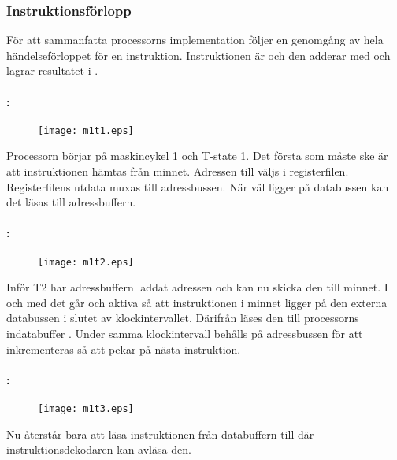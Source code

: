 \documentclass[main.tex]{subfiles}
\newcommand{\diagw}{0.8\textwidth}
\begin{document}
\subsubsection{Instruktionsförlopp}
För att sammanfatta processorns implementation följer en genomgång av hela
händelseförloppet för en instruktion. Instruktionen är  och den
adderar  med  och lagrar resultatet i .

\paragraph{: }
\begin{figure}[H]
    \center
    \texttt{[image: m1t1.eps]}
\end{figure}
Processorn börjar på maskincykel 1 och T-state 1. Det första som måste ske är
att instruktionen hämtas från minnet. Adressen till  väljs i
registerfilen. Registerfilens utdata muxas till adressbussen.  När 
väl ligger på databussen kan det läsas till adressbuffern.

\paragraph{: }
\begin{figure}[H]
    \center
    \texttt{[image: m1t2.eps]}
\end{figure}
Inför T2 har adressbuffern laddat adressen och kan nu skicka den till minnet. I
och med det går  och  aktiva så att instruktionen i minnet
ligger på den externa databussen i slutet av klockintervallet. Därifrån läses
den till processorns indatabuffer . Under samma klockintervall
behålls  på adressbussen för att inkrementeras så att  pekar
på nästa instruktion.

\paragraph{: }
\begin{figure}[H]
    \center
    \texttt{[image: m1t3.eps]}
\end{figure}
Nu återstår bara att läsa instruktionen från databuffern till  där
instruktionsdekodaren kan avläsa den.
\end{document}
